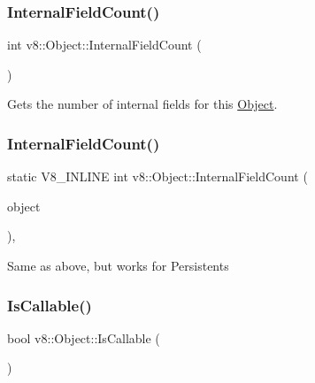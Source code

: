 \subsubsection{\texorpdfstring{Internal\+Field\+Count()}{InternalFieldCount()}\hspace{0.1cm}{\footnotesize\ttfamily [1/2]}}
{\footnotesize\ttfamily int v8\+::\+Object\+::\+Internal\+Field\+Count (\begin{DoxyParamCaption}{ }\end{DoxyParamCaption})}

Gets the number of internal fields for this \mbox{\hyperlink{classv8_1_1Object}{Object}}. \mbox{\label{classv8_1_1Object_a324a71142f621a32bfe5738648718370}} 
\subsubsection{\texorpdfstring{Internal\+Field\+Count()}{InternalFieldCount()}\hspace{0.1cm}{\footnotesize\ttfamily [2/2]}}
{\footnotesize\ttfamily static V8\+\_\+\+I\+N\+L\+I\+NE int v8\+::\+Object\+::\+Internal\+Field\+Count (\begin{DoxyParamCaption}\item[{const \mbox{\hyperlink{classv8_1_1PersistentBase}{Persistent\+Base}}$<$ \mbox{\hyperlink{classv8_1_1Object}{Object}} $>$ \&}]{object }\end{DoxyParamCaption})\hspace{0.3cm}{\ttfamily [inline]}, {\ttfamily [static]}}

Same as above, but works for Persistents \mbox{\label{classv8_1_1Object_a23c2c1f23b50fab4a02e2f819641b865}} 
\subsubsection{\texorpdfstring{Is\+Callable()}{IsCallable()}}
{\footnotesize\ttfamily bool v8\+::\+Object\+::\+Is\+Callable (\begin{DoxyParamCaption}{ }\end{DoxyParamCaption})}

